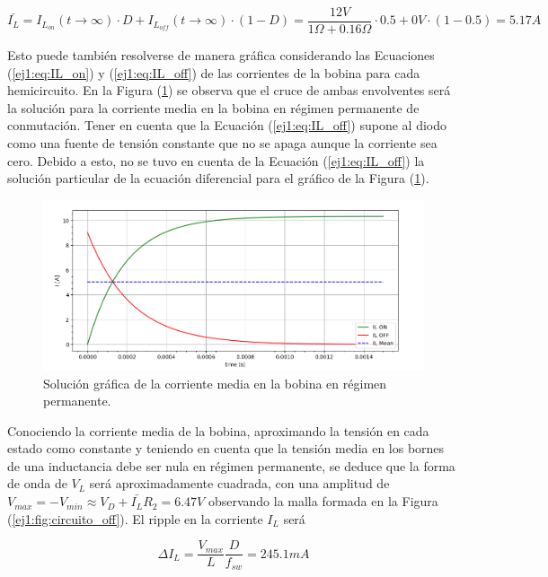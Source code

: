 \begin{equation}
	\bar{I_L} = I_{L_{on}}(t \rightarrow \infty) \cdot D + I_{L_{off}}(t \rightarrow \infty) \cdot (1-D) = \frac{12V}{1\Omega + 0.16\Omega} \cdot 0.5 + 0V \cdot (1-0.5) = 5.17A
\end{equation}

Esto puede también resolverse de manera gráfica considerando las Ecuaciones (\ref{ej1:eq:IL_on}) y (\ref{ej1:eq:IL_off}) de las corrientes de la bobina para cada hemicircuito. En la Figura (\ref{ej1:fig:ILmediagrafico}) se observa que el cruce de ambas envolventes será la solución para la corriente media en la bobina en régimen permanente de conmutación. Tener en cuenta que la Ecuación (\ref{ej1:eq:IL_off}) supone al diodo como una fuente de tensión constante que no se apaga aunque la corriente sea cero. Debido a esto, no se tuvo en cuenta de la Ecuación (\ref{ej1:eq:IL_off}) la solución particular de la ecuación diferencial para el gráfico de la Figura (\ref{ej1:fig:ILmediagrafico}).

\begin{figure}[H]
	\centering
	\includegraphics[width=0.8\linewidth]{ImagenesEjercicio-1/solgraficaIL}
	\caption{Solución gráfica de la corriente media en la bobina en régimen permanente.}
	\label{ej1:fig:ILmediagrafico}
\end{figure}

Conociendo la corriente media de la bobina, aproximando la tensión en cada estado como constante y teniendo en cuenta que la tensión media en los bornes de una inductancia debe ser nula en régimen permanente, se deduce que la forma de onda de $V_L$ será aproximadamente cuadrada, con una amplitud de $V_{max} = -V_{min} \approx V_D + \bar{I_L}R_2 = 6.47V$ observando la malla formada en la Figura (\ref{ej1:fig:circuito_off}). El ripple en la corriente $I_L$ será 

\begin{equation}
\Delta I_L = \frac{V_{max}}{L}\frac{D}{f_{sw}} = 245.1mA
\end{equation}

